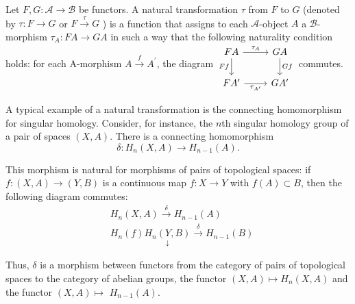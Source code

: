 Let $F, G: \mathcal{A} \rightarrow \mathcal{B}$ be functors. A natural transformation $\tau$ from $F$ to $G$ (denoted by $\tau: F \rightarrow G$ or $F \xrightarrow{\tau} G$ ) is a function that assigns to each $\mathcal{A}$-object $A$ a $\mathcal{B}$-morphism $\tau_A: F A \rightarrow G A$ in such a way that the following naturality condition holds: for each A-morphism $A \xrightarrow{f} A^{\prime}$, the diagram
$
\begin{tikzcd}
FA \arrow[r, "\tau_A"] \arrow[d, "Ff"'] & GA \arrow[d, "Gf"] \\
FA' \arrow[r, "\tau_{A'}"'] & GA'
\end{tikzcd}
$ commutes.\\

\begin{example}
    A typical example of a natural transformation is the connecting homomorphism for singular homology. Consider, for instance, the $n$th singular homology group of a pair of spaces $(X, A)$. There is a connecting homomorphism
$$
\delta: H_n(X, A) \rightarrow H_{n-1}(A) .
$$

This morphism is natural for morphisms of pairs of topological spaces: if $f:(X, A) \rightarrow(Y, B)$ is a continuous map $f: X \rightarrow Y$ with $f(A) \subset B$, then the following diagram commutes:
$$
\begin{aligned}
& H_n(X, A) \xrightarrow{\delta} H_{n-1}(A) \\
& H_n(f) \underset{\downarrow}{H_n(Y, B)} \xrightarrow{\delta} H_{n-1}(B)
\end{aligned}
$$

Thus, $\delta$ is a morphism between functors from the category of pairs of topological spaces to the category of abelian groups, the functor $(X, A) \mapsto H_n(X, A)$ and the functor $(X, A) \mapsto$ $H_{n-1}(A)$. \\


\end{example}
